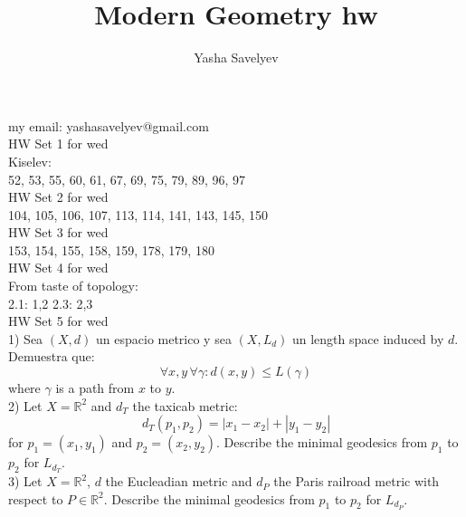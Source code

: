 \documentclass{amsart}
\numberwithin{equation}{section}
\theoremstyle{definition}
\theoremstyle{remark}
\begin{document}
\title{Modern Geometry hw}
\author{Yasha Savelyev}
\address{University of Colima}
\maketitle
\section{}
my email: yashasavelyev@gmail.com
\\

HW Set 1 for wed
\\

Kiselev: 
\\

52, 53, 55, 60, 61, 67, 69, 75, 79, 89, 96, 97
\\

HW Set 2 for wed
\\

104, 105, 106, 107, 113, 114, 141, 143, 145, 150
\\

HW Set 3 for wed
\\

153, 154, 155, 158, 159, 178, 179, 180
\\


HW Set 4 for wed
\\


From taste of topology:
\\

2.1: 1,2 
2.3: 2,3 
\\


HW Set 5 for wed
\\

1) Sea $(X, d) $ un espacio metrico y sea $(X, L _{d})$ un length space induced by $d$. Demuestra que: $$\forall x,y \, \forall \gamma: d (x,y) \leq L (\gamma)$$ where $\gamma$  is a path from $x$ to $y$. 
\\

2) Let $X = \mathbb{R} ^{2}$ and $d _{T}$ the taxicab metric:
$$d _{T} (p _{1}, p _{2}) = |x _{1} - x _{2}| + |y _{1} - y _{2}|$$ for $p _{1} = (x _{1}, y _{1}) $ and $p _{2} = (x _{2}, y _{2})$.
Describe the minimal geodesics from $p _{1}$ to $p _{2}$ for $L _{d _{T}}$. 
\\

3) Let $X = \mathbb{R} ^{2}$, $d$  the Eucleadian metric and $d _{P}$ the Paris railroad metric with respect to $P \in \mathbb{R} ^{2}$. Describe the minimal geodesics from $p _{1}$  to $p _{2}$ for $L _{d _{P}}$. 
\\
\end{document}
